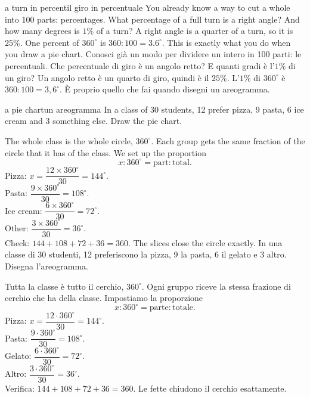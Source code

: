\begin{think}{a turn in percent}{il giro in percentuale}
You already know a way to cut a whole into 100 parts: percentages. What percentage of a full turn is a right angle? And how many degrees is $1\%$ of a turn?
\answer A right angle is a quarter of a turn, so it is $25\%$. One percent of $360^\circ$ is $360 : 100 = 3.6^\circ$. This is exactly what you do when you draw a pie chart.
\tcblower
Conosci già un modo per dividere un intero in 100 parti: le percentuali. Che percentuale di giro è un angolo retto? E quanti gradi è l'$1\%$ di un giro?
\answer Un angolo retto è un quarto di giro, quindi è il $25\%$. L'$1\%$ di $360^\circ$ è $360 : 100 = 3{,}6^\circ$. È proprio quello che fai quando disegni un areogramma.
\end{think}

\begin{example}{a pie chart}{un areogramma}
In a class of 30 students, 12 prefer pizza, 9 pasta, 6 ice cream and 3 something else. Draw the pie chart.

The whole class is the whole circle, $360^\circ$. Each group gets the same fraction of the circle that it has of the class. We set up the proportion
\[ x : 360^\circ = \text{part} : \text{total}. \]
Pizza: $x = \dfrac{12 \times 360^\circ}{30} = 144^\circ$. \\
Pasta: $\dfrac{9 \times 360^\circ}{30} = 108^\circ$. \\
Ice cream: $\dfrac{6 \times 360^\circ}{30} = 72^\circ$. \\
Other: $\dfrac{3 \times 360^\circ}{30} = 36^\circ$. \\
Check: $144 + 108 + 72 + 36 = 360$. The slices close the circle exactly.
\tcblower
In una classe di 30 studenti, 12 preferiscono la pizza, 9 la pasta, 6 il gelato e 3 altro. Disegna l'areogramma.

Tutta la classe è tutto il cerchio, $360^\circ$. Ogni gruppo riceve la stessa frazione di cerchio che ha della classe. Impostiamo la proporzione
\[ x : 360^\circ = \text{parte} : \text{totale}. \]
Pizza: $x = \dfrac{12 \cdot 360^\circ}{30} = 144^\circ$. \\
Pasta: $\dfrac{9 \cdot 360^\circ}{30} = 108^\circ$. \\
Gelato: $\dfrac{6 \cdot 360^\circ}{30} = 72^\circ$. \\
Altro: $\dfrac{3 \cdot 360^\circ}{30} = 36^\circ$. \\
Verifica: $144 + 108 + 72 + 36 = 360$. Le fette chiudono il cerchio esattamente.
\end{example}

